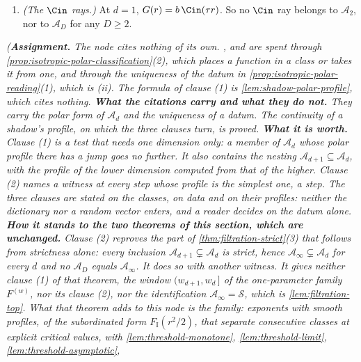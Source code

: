 \begin{proposition}
\begin{enumerate}
radial: it is $\xi \mapsto G(|\xi|)$ for a function $G$ on $[0,\infty)$. This $G$ belongs to
$\mathcal{A}_d \setminus \mathcal{A}_{d+1}$. Hence $\mathcal{A}_{d+1} \subsetneq \mathcal{A}_d$
for every $d \ge 1$.
\item \emph{(The $\Cin$ rays.)} At $d = 1$, $G(r) = b\,\Cin(\tau r)$. So no $\Cin$ ray belongs
to $\mathcal{A}_2$, nor to $\mathcal{A}_D$ for any $D \ge 2$.
\end{enumerate}
\statusA\quad{}\quad{}\quad{}\quad\emph{(\textbf{Assignment.} The node
cites nothing of its own. ,  and  are spent through
\ref{prop:isotropic-polar-classification}(2), which places a function in a class or takes it
from one, and through the uniqueness of the datum in \ref{prop:isotropic-polar-reading}(1), which
is (ii). The formula of clause (1) is
\ref{lem:shadow-polar-profile}, which cites nothing. \textbf{What the citations carry and what
they do not.} They carry the polar form of $\mathcal{A}_d$ and the uniqueness of a datum. The
continuity of a shadow's profile, on which the three clauses turn, is proved.
\textbf{What it is worth.} Clause (1) is a test that needs one dimension only: a member of
$\mathcal{A}_d$ whose polar profile there has a jump goes no further. It also contains the
nesting $\mathcal{A}_{d+1} \subseteq \mathcal{A}_d$, with the profile of the lower dimension
computed from that of the higher. Clause (2) names a witness at every step whose profile is the
simplest one, a step. The three clauses are stated on the classes, on data and on their
profiles: neither the dictionary nor a random vector enters, and a reader decides on the datum
alone. \textbf{How it stands to the two theorems of this section, which are
unchanged.} Clause (2) reproves the part of \ref{thm:filtration-strict}(3) that follows from
strictness alone: every inclusion $\mathcal{A}_{d+1} \subsetneq \mathcal{A}_d$ is strict, hence
$\mathcal{A}_\infty \subsetneq \mathcal{A}_d$ for every $d$ and no $\mathcal{A}_D$ equals
$\mathcal{A}_\infty$. It does so with another witness. It gives neither clause (1) of that
theorem, the window $(w_{d+1}, w_d\,]$ of the one-parameter family $F^{(w)}$, nor its clause
(2), nor the identification $\mathcal{A}_\infty = \mathcal{S}$, which is
\ref{lem:filtration-top}. What that theorem adds to this node is the family: exponents with
smooth profiles, of the subordinated form $F_{\mathrm I}(r^2/2)$, that separate consecutive
classes at explicit critical values, with \ref{lem:threshold-monotone},
\ref{lem:threshold-limit}, \ref{lem:threshold-asymptotic},
}
\end{proposition}

